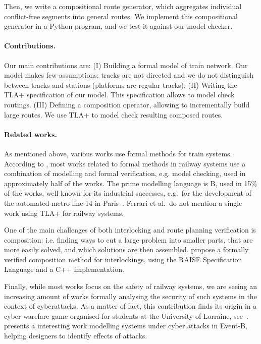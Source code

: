 \documentclass[runningheads]{llncs}
\begin{document}
Then, we write a compositional route generator, which aggregates individual conflict-free segments into general routes. We implement this compositional generator in a Python program, and we test it against our model checker.

\paragraph{Contributions.}
Our main contributions are: (I) Building a formal model of train network. Our model makes few assumptions: tracks are not directed and we do not distinguish between tracks and stations (platforms are regular tracks). (II) Writing the TLA+ specification of our model. This specification allows to model check routings. (III) Defining a composition operator, allowing to incrementally build large routes. We use TLA+ to model check resulting composed routes.

\paragraph{Related works.}

As mentioned above, various works use formal methods for train systems. According to \cite{Ferrari_Formal_2022}, most works related to formal methods in railway systems use a combination of modelling and formal verification, e.g. model checking, used in approximately half of the works. The prime modelling language is B, used in 15\% of the works, well known for its industrial successes, e.g.\ for the development of the automated metro line 14 in Paris~\cite{butler_first_2020}. Ferrari et al.\ do not mention a single work using TLA+ for railway systems.

One of the main challenges of both interlocking and route planning verification is composition: i.e. finding ways to cut a large problem into smaller parts, that are more easily solved, and which solutions are then assembled. \cite{haxthausen_automated_2023} propose a formally verified composition method for interlockings, using the RAISE Specification Language and a C++ implementation.

Finally, while most works focus on the safety of railway systems, we are seeing an increasing amount of works formally analysing the security of such systems in the context of cyberattacks. As a matter of fact, this contribution finds its origin in a cyber-warefare game organised for students at the University of Lorraine, see~\cite{CHE}. \cite{poorhadi_automating_2023} presents a interesting work modelling systems under cyber attacks in Event-B, helping designers to identify effects of attacks.
\end{document}
